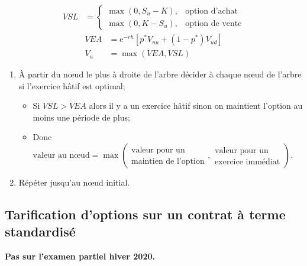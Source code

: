 \documentclass[10pt, french]{article}
\begin{document}
\begin{multicols*}{2}
\begin{distributions}
\begin{align*}
VSL	&=	
	\begin{cases}
	\max(0, S_{u} - K),	&	\text{option d'achat}	\\
	\max(0, K - S_{u}),	&	\text{option de vente}
	\end{cases}
\end{align*}
\begin{align*}
	VEA	
	&=		\textrm{e}^{-r h}\left[ p^{*}V_{uu} + (1 - p^{*})V_{ud} \right]	\\
	V_{u}	
	&=	\max(VEA, VSL)
\end{align*}
\end{distributions}

\begin{algo2}
\begin{enumerate}[label	=	\circled{\arabic*}{trueblue}]
	\item	À partir du nœud le plus à droite de l'arbre décider à chaque nœud de l'arbre si l'exercice hâtif est optimal;
		\begin{itemize}[leftmargin = *]
		\item	Si $VSL > VEA$ alors il y a un exercice hâtif sinon on maintient l'option au moins une période de plus;
		\item	Donc $\text{valeur au nœud} = \max\left(\substack{\text{valeur pour un}\\ \text{maintien de l'option}}, \substack{\text{valeur pour un}\\ \text{exercice immédiat}}\right)$.
		\end{itemize}
	\item	Répéter jusqu'au nœud initial.
\end{enumerate}
\end{algo2}

\subsection{Tarification d'options sur un contrat à terme standardisé}
\textbf{Pas sur l'examen partiel hiver 2020.}


\end{multicols*}
\end{document}
